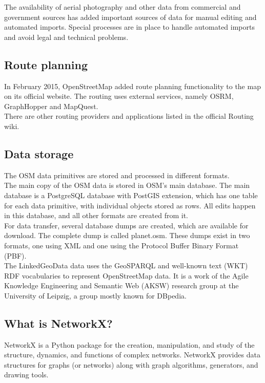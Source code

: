 The availability of aerial photography and other data from commercial and government sources has added important sources of data for manual editing and automated imports. Special processes are in place to handle automated imports and avoid legal and technical problems.
\subsection{ Route planning}

In February 2015, OpenStreetMap added route planning functionality to the map on its official website. The routing uses external services, namely OSRM, GraphHopper and MapQuest.\\

There are other routing providers and applications listed in the official Routing wiki.

\subsection{Data storage}
The OSM data primitives are stored and processed in different formats.\\

The main copy of the OSM data is stored in OSM's main database. The main database is a PostgreSQL database with PostGIS extension, which has one table for each data primitive, with individual objects stored as rows. All edits happen in this database, and all other formats are created from it.\\

For data transfer, several database dumps are created, which are available for download. The complete dump is called planet.osm. These dumps exist in two formats, one using XML and one using the Protocol Buffer Binary Format (PBF).\\

The LinkedGeoData data uses the GeoSPARQL and well-known text (WKT) RDF vocabularies to represent OpenStreetMap data. It is a work of the Agile Knowledge Engineering and Semantic Web (AKSW) research group at the University of Leipzig, a group mostly known for DBpedia.
\subsection{What is NetworkX?}
NetworkX is a Python package for the creation, manipulation, and study of the structure, dynamics, and functions of complex networks.
NetworkX provides data structures for graphs (or networks) along with graph algorithms, generators, and drawing tools.

